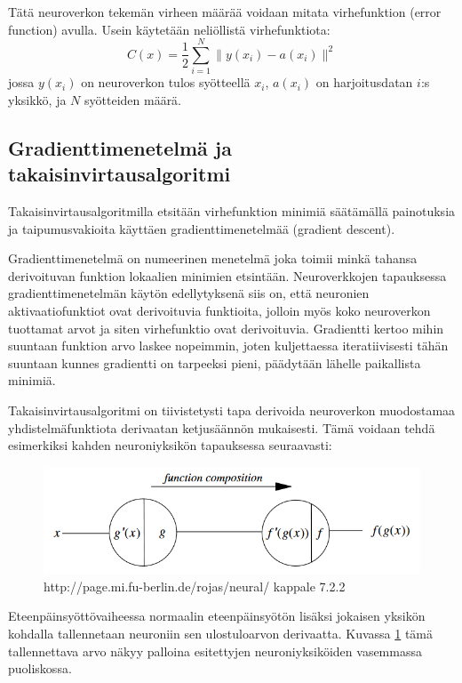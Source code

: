 \documentclass[finnish]{tktltiki2}
\theoremstyle{definition}
\theoremstyle{remark}
\begin{document}
  Tätä neuroverkon tekemän virheen määrää voidaan mitata virhefunktion (error function) avulla. Usein käytetään neliöllistä virhefunktiota:
    $$C(x) = \frac{1}{2} \sum_{i=1}^{N} \| y(x_i)-a(x_i) \|^2$$
  jossa $y(x_i)$ on neuroverkon tulos syötteellä $x_i$, $a(x_i)$ on harjoitusdatan $i$:s yksikkö, ja $N$ syötteiden määrä.


  \subsection{Gradienttimenetelmä ja takaisinvirtausalgoritmi}

  Takaisinvirtausalgoritmilla etsitään virhefunktion minimiä säätämällä painotuksia ja taipumusvakioita käyttäen gradienttimenetelmää (gradient descent).

  Gradienttimenetelmä on numeerinen menetelmä joka toimii minkä tahansa derivoituvan funktion lokaalien minimien etsintään. Neuroverkkojen tapauksessa gradienttimenetelmän käytön edellytyksenä siis on, että neuronien aktivaatiofunktiot ovat derivoituvia funktioita, jolloin myös koko neuroverkon tuottamat arvot ja siten virhefunktio ovat derivoituvia. Gradientti kertoo mihin suuntaan funktion arvo laskee nopeimmin, joten kuljettaessa iteratiivisesti tähän suuntaan kunnes gradientti on tarpeeksi pieni, päädytään lähelle paikallista minimiä.

  Takaisinvirtausalgoritmi on tiivistetysti tapa derivoida neuroverkon muodostamaa yhdistelmäfunktiota derivaatan ketjusäännön mukaisesti. Tämä voidaan tehdä esimerkiksi kahden neuroniyksikön tapauksessa seuraavasti: 
  
  \begin{figure}[h]
    \label{pic:composition}
    \centering
    \includegraphics[scale=0.5]{function-composition}
    \caption{http://page.mi.fu-berlin.de/rojas/neural/ kappale 7.2.2}
  \end{figure}
  
  Eteenpäinsyöttövaiheessa normaalin eteenpäinsyötön lisäksi jokaisen yksikön kohdalla tallennetaan neuroniin sen ulostuloarvon derivaatta. Kuvassa \ref{pic:composition} tämä tallennettava arvo näkyy palloina esitettyjen neuroniyksiköiden vasemmassa puoliskossa.
\end{document}
